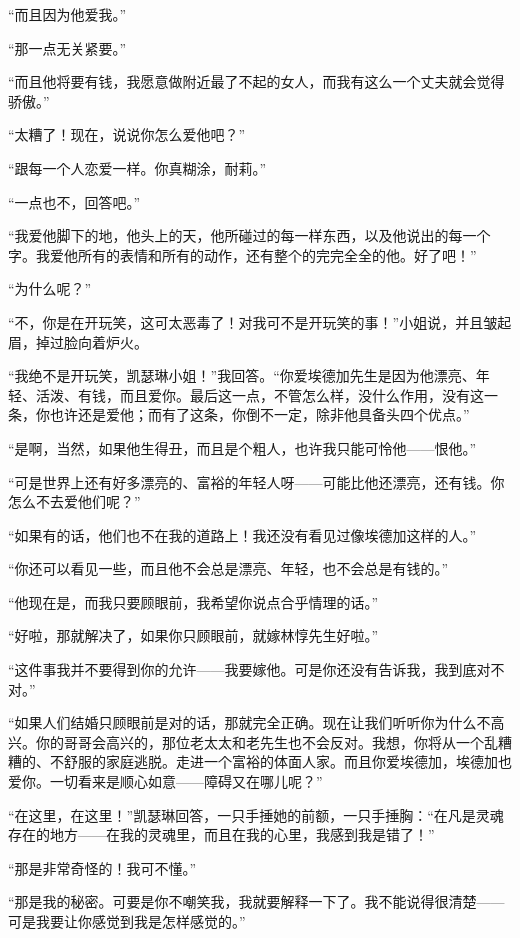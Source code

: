 \par “而且因为他爱我。”
\par “那一点无关紧要。”
\par “而且他将要有钱，我愿意做附近最了不起的女人，而我有这么一个丈夫就会觉得骄傲。”
\par “太糟了！现在，说说你怎么爱他吧？”
\par “跟每一个人恋爱一样。你真糊涂，耐莉。”
\par “一点也不，回答吧。”
\par “我爱他脚下的地，他头上的天，他所碰过的每一样东西，以及他说出的每一个字。我爱他所有的表情和所有的动作，还有整个的完完全全的他。好了吧！”
\par “为什么呢？”
\par “不，你是在开玩笑，这可太恶毒了！对我可不是开玩笑的事！”小姐说，并且皱起眉，掉过脸向着炉火。
\par “我绝不是开玩笑，凯瑟琳小姐！”我回答。“你爱埃德加先生是因为他漂亮、年轻、活泼、有钱，而且爱你。最后这一点，不管怎么样，没什么作用，没有这一条，你也许还是爱他；而有了这条，你倒不一定，除非他具备头四个优点。”
\par “是啊，当然，如果他生得丑，而且是个粗人，也许我只能可怜他——恨他。”
\par “可是世界上还有好多漂亮的、富裕的年轻人呀——可能比他还漂亮，还有钱。你怎么不去爱他们呢？”
\par “如果有的话，他们也不在我的道路上！我还没有看见过像埃德加这样的人。”
\par “你还可以看见一些，而且他不会总是漂亮、年轻，也不会总是有钱的。”
\par “他现在是，而我只要顾眼前，我希望你说点合乎情理的话。”
\par “好啦，那就解决了，如果你只顾眼前，就嫁林惇先生好啦。”
\par “这件事我并不要得到你的允许——我要嫁他。可是你还没有告诉我，我到底对不对。”
\par “如果人们结婚只顾眼前是对的话，那就完全正确。现在让我们听听你为什么不高兴。你的哥哥会高兴的，那位老太太和老先生也不会反对。我想，你将从一个乱糟糟的、不舒服的家庭逃脱。走进一个富裕的体面人家。而且你爱埃德加，埃德加也爱你。一切看来是顺心如意——障碍又在哪儿呢？”
\par “在这里，在这里！”凯瑟琳回答，一只手捶她的前额，一只手捶胸：“在凡是灵魂存在的地方——在我的灵魂里，而且在我的心里，我感到我是错了！”
\par “那是非常奇怪的！我可不懂。”
\par “那是我的秘密。可要是你不嘲笑我，我就要解释一下了。我不能说得很清楚——可是我要让你感觉到我是怎样感觉的。”
